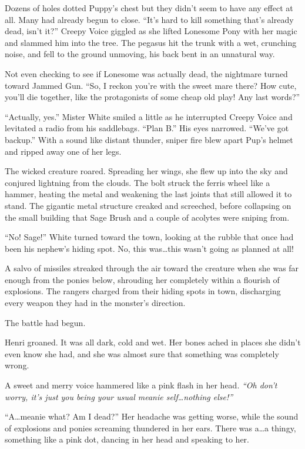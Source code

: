 Dozens of holes dotted Puppy's chest but they didn't seem to have any effect at all. Many had already begun to close. ``It's hard to kill something that's already dead, isn't it?'' Creepy Voice giggled as she lifted Lonesome Pony with her magic and slammed him into the tree. The pegasus hit the trunk with a wet, crunching noise, and fell to the ground unmoving, his back bent in an unnatural way.

Not even checking to see if Lonesome was actually dead, the nightmare turned toward Jammed Gun. ``So, I reckon you're with the sweet mare there? How cute, you'll die together, like the protagonists of some cheap old play! Any last words?''

``Actually, yes.'' Mister White smiled a little as he interrupted Creepy Voice and levitated a radio from his saddlebags. ``Plan B.'' His eyes narrowed. ``We've got backup.'' With a sound like distant thunder, sniper fire blew apart Pup's helmet and ripped away one of her legs.

The wicked creature roared. Spreading her wings, she flew up into the sky and conjured lightning from the clouds. The bolt struck the ferris wheel like a hammer, heating the metal and weakening the last joints that still allowed it to stand. The gigantic metal structure creaked and screeched, before collapsing on the small building that Sage Brush and a couple of acolytes were sniping from.

``No! Sage!'' White turned toward the town, looking at the rubble that once had been his nephew's hiding spot. No, this was\dots this wasn't going as planned at all!

A salvo of missiles streaked through the air toward the creature when she was far enough from the ponies below, shrouding her completely within a flourish of explosions. The rangers charged from their hiding spots in town, discharging every weapon they had in the monster's direction.

The battle had begun.


\horizonline


Henri groaned. It was all dark, cold and wet. Her bones ached in places she didn't even know she had, and she was almost sure that something was completely wrong.

A sweet and merry voice hammered like a pink flash in her head. \emph{``Oh don't worry, it's just you being your usual meanie self\dots nothing else!''}

``A\dots meanie what? Am I dead?'' Her headache was getting worse, while the sound of explosions and ponies screaming thundered in her ears. There was a\dots a thingy, something like a pink dot, dancing in her head and speaking to her.

